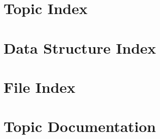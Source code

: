 \documentclass[twoside]{book}
\newcommand{\+}{\discretionary{\mbox{\scriptsize$\hookleftarrow$}}{}{}}
\begin{document}
\chapter{Topic Index}

\chapter{Data Structure Index}

\chapter{File Index}

\chapter{Topic Documentation}












































\end{document}
